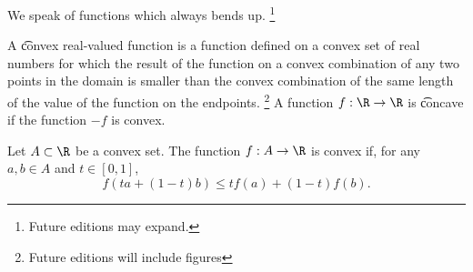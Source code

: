 
We speak of functions which always bends up.
  \ifhmode\unskip\fi\footnote{
Future editions may expand.
  }


A \t{convex} real-valued function is a function defined on a convex set of real numbers for which the result of the function on a convex combination of any two points in the domain is smaller than the convex combination of the same length of the value of the function on the endpoints.
  \ifhmode\unskip\fi\footnote{
Future editions will include figures
  }
A function $f: \R \to \R$ is \t{concave} if the function $-f$ is convex.


Let $A \subset \R$ be a convex set.
The function $f: A \to \R$ is convex if, for any $a, b \in A$ and $t \in [0, 1]$,
  \[
f(ta + (1-t)b) \leq tf(a) + (1-t)f(b).
  \]

\blankpage
